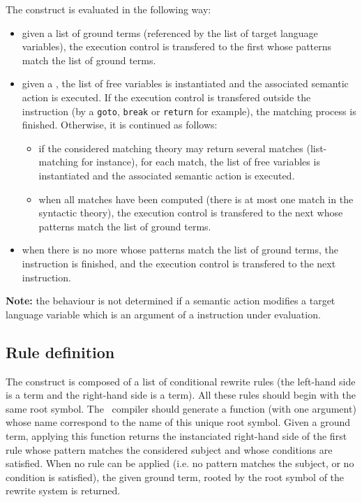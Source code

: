 The  construct is evaluated in the following way:
\begin{itemize}
\item given a list of ground terms (referenced by the list of target
  language variables), the execution control is transfered to the
  first  whose patterns match the list of ground
  terms.
\item given a , the list of free variables is
  instantiated and the associated semantic action is executed.
  If the execution control is transfered outside the
   instruction (by a \texttt{goto}, \texttt{break} or
  \texttt{return} for example), the matching process is finished.
  Otherwise, it is continued as follows:
  \begin{itemize}
  \item if the considered matching theory may return several matches
    (list-matching for instance), for each match, the list of free
    variables is instantiated and the associated semantic action is
    executed.
  \item when all matches have been computed (there is at most one match
    in the syntactic theory), the execution control is transfered to
    the next  whose patterns match the list of
    ground terms. 
  \end{itemize}

\item when there is no more  whose patterns
  match the list of ground terms, the  instruction is
  finished, and the execution control is transfered to the next
  instruction. 
\end{itemize}

\noindent
\textbf{Note:} the behaviour is not determined if a semantic action
modifies a target language variable which is an argument of a
 instruction under evaluation.

\subsection{Rule definition}

The  construct is composed of a list of conditional
rewrite rules (the left-hand side is a term and the right-hand side is
a term). All these rules should begin with the same root symbol. The
\TOM\ compiler should generate a function (with one argument) whose
name correspond to the name of this unique root symbol.
Given a ground term, applying this function returns the instanciated
right-hand side of the first rule whose pattern matches the considered 
subject and whose conditions are satisfied.
When no rule can be applied (i.e. no pattern matches the subject, or
no condition is satisfied), the given ground term, rooted by the root
symbol of the rewrite system is returned.

